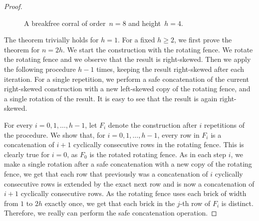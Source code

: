 \documentclass[runningheads,envcountsame]{llncs}
\let\ge\geqslant
\begin{document}
\thmcorral*
\begin{proof}
\begin{figure}[ht]
    \centering
    \caption{A breakfree corral of order~\(n=8\) and height~\(h=4\).}
    \label{fig:corral_final}
\end{figure}
    The theorem trivially holds for $h=1$.
    For a fixed $h \ge 2$, we first prove the theorem for $n=2h$.
    We start the construction with the rotating fence.
    We rotate the rotating fence and we observe that the result is right-skewed.
    Then we apply the following procedure $h-1$ times, keeping the result right-skewed after each iteration.
    For a single repetition, we perform a safe concatenation of the current right-skewed construction with a new left-skewed copy of the rotating fence, and a single rotation of the result.
    It is easy to see that the result is again right-skewed.

    For every $i=0,1,\ldots,h-1$, let $F_i$ denote the construction after $i$ repetitions of the procedure.
    We show that, for $i=0,1,\ldots,h-1$, every row in $F_i$ is a concatenation of $i+1$ cyclically consecutive rows in the rotating fence.
    This is clearly true for $i=0$, as $F_0$ is the rotated rotating fence.
    As in each step $i$, we make a single rotation after a safe concatenation with a new copy of the rotating fence, we get that each row that previously was a concatenation of $i$ cyclically consecutive rows is extended by the exact next row and is now a concatenation of $i+1$ cyclically consecutive rows.
    As the rotating fence uses each brick of width from $1$ to $2h$ exactly once,
    we get that each brick in the $j$-th row of $F_i$ is distinct.
    Therefore, we really can perform the safe concatenation operation.


\end{proof}
\end{document}
